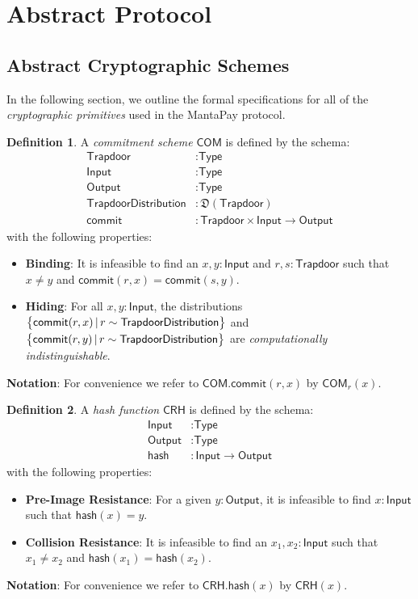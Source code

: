 \documentclass[a4paper]{article}
\newcommand{\lsection}[2]{\def\sectionlabel{#2} \section{#1}\label{sec:#2}}
\theoremstyle{definition}
\newtheorem{definition}{Definition}[subsection]
\newcommand{\COM}{{\textsf{COM}}}
\newcommand{\CRH}{{\textsf{CRH}}}
\newcommand{\Input}{{\textsf{Input}}}
\newcommand{\MantaPay}{{\textsf{MantaPay}}}
\newcommand{\Output}{{\textsf{Output}}}
\newcommand{\TrapdoorDistribution}{{\textsf{TrapdoorDistribution}}}
\newcommand{\Trapdoor}{{\textsf{Trapdoor}}}
\newcommand{\Type}{{\textsf{Type}}}
\newcommand{\commit}{{\textsf{commit}}}
\newcommand{\hash}{{\textsf{hash}}}
\begin{document}
\lsection{Abstract Protocol}{abstract-protocol}

\subsection{Abstract Cryptographic Schemes}

In the following section, we outline the formal specifications for all of the \emph{cryptographic primitives} used in the \MantaPay{} protocol.

\begin{definition}
    A \emph{commitment scheme} $\COM$ is defined by the schema:
    \begin{align*}
        \Trapdoor             &: \Type \\
        \Input                &: \Type \\
        \Output               &: \Type \\
        \TrapdoorDistribution &: \mathfrak{D}(\Trapdoor) \\
        \commit               &: \Trapdoor \times \Input \to \Output
    \end{align*}
    with the following properties:

    \begin{itemize}
        \item \textbf{Binding}: It is infeasible to find an $x, y : \Input$ and $r, s: \Trapdoor$ such that $x \ne y$ and $\commit(r,x) = \commit(s,y)$.
        \item \textbf{Hiding}: For all $x, y : \Input$, the distributions $\set{\commit(r,x) \,|\, r \sim \TrapdoorDistribution}$ and \\ $\set{\commit(r,y) \,|\, r \sim \TrapdoorDistribution}$ are \emph{computationally indistinguishable}.
    \end{itemize}

\textbf{Notation}: For convenience we refer to $\COM.\commit(r,x)$ by $\COM_r(x)$.
\end{definition}

\begin{definition}
A \emph{hash function} $\CRH$ is defined by the schema:
\begin{align*}
    \Input  &: \Type \\
    \Output &: \Type \\
    \hash   &: \Input \to \Output
\end{align*}
with the following properties:

\begin{itemize}
    \item \textbf{Pre-Image Resistance}: For a given $y : \Output$, it is infeasible to find $x : \Input$ such that $\hash(x) = y$.
    \item \textbf{Collision Resistance}: It is infeasible to find an $x_1, x_2 : \Input$ such that $x_1 \ne x_2$ and $\hash(x_1) = \hash(x_2)$.
\end{itemize}

\textbf{Notation}: For convenience we refer to $\CRH.\hash(x)$ by $\CRH(x)$.
\end{definition}
\end{document}
